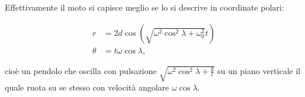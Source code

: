 \documentclass[../main.tex]{subfiles}
\begin{document}
Effettivamente il moto si capisce meglio se lo si descrive in coordinate polari:

\begin{align*}
	r &=  2d\cos\left(\sqrt{\omega^2\cos^2 \lambda + \omega^2_0} t\right)\\
	\theta &=t  \omega\cos\lambda,
\end{align*}

cioè un pendolo che oscilla con pulsazione $\sqrt{\omega^2\cos^2 \lambda + \frac{g}{l}}$ su un piano verticale
il quale ruota su se stesso con velocità angolare $\omega\cos\lambda$.
\end{document}
